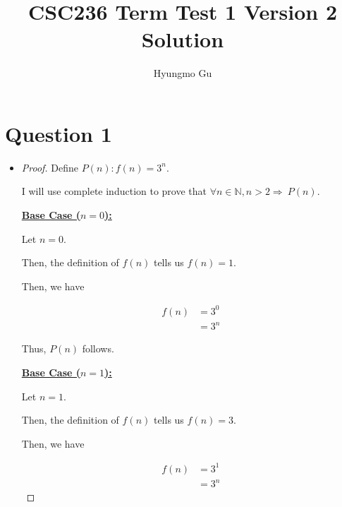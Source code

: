 \documentclass[12pt]{article}
\begin{document}
\title{CSC236 Term Test 1 Version 2 Solution}
\author{Hyungmo Gu}
\maketitle

\section*{Question 1}
\begin{itemize}
    \item

    \begin{proof}
    Define $P(n):f(n) = 3^n$.

    \bigskip

    I will use complete induction to prove that $\forall n \in \mathbb{N}, n > 2 \Rightarrow \:P(n)$.

    \bigskip

    \underline{\textbf{Base Case ($n = 0$):}}

    \bigskip

    Let $n = 0$.

    \bigskip

    Then, the definition of $f(n)$ tells us $f(n) = 1$.

    \bigskip

    Then, we have

    \begin{align}
        f(n) &= 3^0\\
        &= 3^n
    \end{align}

    \bigskip

    Thus, $P(n)$ follows.

    \bigskip

    \underline{\textbf{Base Case ($n = 1$):}}

    \bigskip

    Let $n = 1$.

    \bigskip

    Then, the definition of $f(n)$ tells us $f(n) = 3$.

    \bigskip

    Then, we have

    \begin{align}
        f(n) &= 3^1\\
        &= 3^n
    \end{align}

    \bigskip


\end{proof}
\end{itemize}
\end{document}
